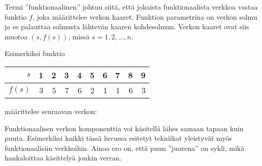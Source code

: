 Termi ''funktionaalinen'' johtuu siitä,
että jokaista funktionaalista verkkoa vastaa
funktio $f$, joka määrittelee verkon kaaret.
Funktion parametrina on verkon solmu ja
se palauttaa solmusta lähtevän kaaren kohdesolmun.
Verkon kaaret ovat siis muotoa $(s,f(s))$,
missä $s=1,2,\ldots,n$.

Esimerkiksi funktio

\begin{center}
\begin{tabular}{r|rrrrrrrrr}
$s$ & 1 & 2 & 3 & 4 & 5 & 6 & 7 & 8 & 9 \\
\hline
$f(s)$ & 3 & 5 & 7 & 6 & 2 & 1 & 1 & 6 & 3 \\
\end{tabular}
\end{center}

määrittelee seuraavan verkon:

\begin{center}
\end{center}

Funktionaalisen verkon komponenttia voi käsitellä
lähes samaan tapaan kuin puuta.
Esimerkiksi kaikki tässä luvussa esitetyt
tekniikat yleistyvät myös funktionaalisiin verkkoihin.
Ainoa ero on, että puun ''juurena'' on sykli,
mikä hankaloittaa käsittelyä jonkin verran.
